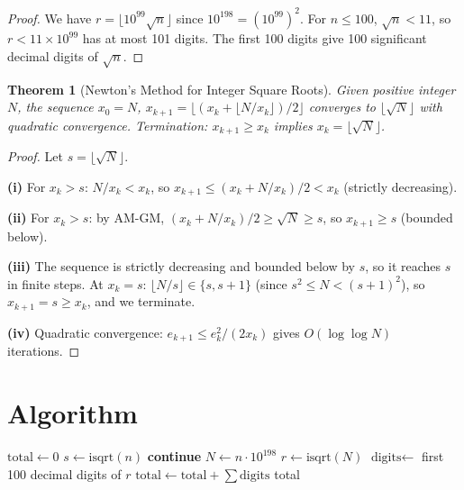 \documentclass[11pt]{article}
\newtheorem{theorem}{Theorem}
\begin{document}
\begin{proof}
We have $r = \lfloor 10^{99}\sqrt{n}\rfloor$ since $10^{198} = (10^{99})^2$. For $n \leq 100$, $\sqrt{n} < 11$, so $r < 11 \times 10^{99}$ has at most 101 digits. The first 100 digits give 100 significant decimal digits of $\sqrt{n}$.
\end{proof}

\begin{theorem}[Newton's Method for Integer Square Roots]
Given positive integer $N$, the sequence $x_0 = N$, $x_{k+1} = \lfloor(x_k + \lfloor N/x_k\rfloor)/2\rfloor$ converges to $\lfloor\sqrt{N}\rfloor$ with quadratic convergence. Termination: $x_{k+1} \geq x_k$ implies $x_k = \lfloor\sqrt{N}\rfloor$.
\end{theorem}

\begin{proof}
Let $s = \lfloor\sqrt{N}\rfloor$.

\textbf{(i)} For $x_k > s$: $N/x_k < x_k$, so $x_{k+1} \leq (x_k + N/x_k)/2 < x_k$ (strictly decreasing).

\textbf{(ii)} For $x_k > s$: by AM-GM, $(x_k + N/x_k)/2 \geq \sqrt{N} \geq s$, so $x_{k+1} \geq s$ (bounded below).

\textbf{(iii)} The sequence is strictly decreasing and bounded below by $s$, so it reaches $s$ in finite steps. At $x_k = s$: $\lfloor N/s\rfloor \in \{s, s+1\}$ (since $s^2 \leq N < (s+1)^2$), so $x_{k+1} = s \geq x_k$, and we terminate.

\textbf{(iv)} Quadratic convergence: $e_{k+1} \leq e_k^2/(2x_k)$ gives $O(\log\log N)$ iterations.
\end{proof}

\section{Algorithm}

\begin{algorithm}[H]
\caption{Sum of digital sums of first 100 digits of irrational $\sqrt{n}$ for $n = 1, \ldots, 100$}
\begin{algorithmic}[1]
\STATE $\text{total} \gets 0$
    \STATE $s \gets \text{isqrt}(n)$
        \STATE \textbf{continue} 
    \ENDIF
    \STATE $N \gets n \cdot 10^{198}$
    \STATE $r \gets \text{isqrt}(N)$ 
    \STATE $\text{digits} \gets$ first 100 decimal digits of $r$
    \STATE $\text{total} \gets \text{total} + \sum \text{digits}$
\ENDFOR
\RETURN total
\end{algorithmic}
\end{algorithm}
\end{document}
